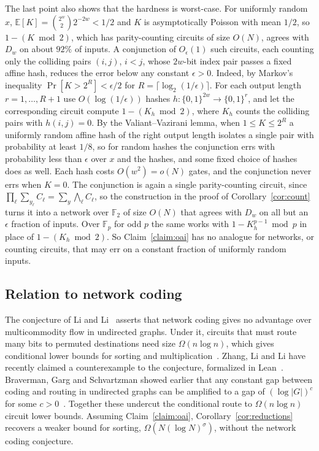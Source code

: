 \documentclass[11pt]{article}
\theoremstyle{definition}
\newcommand{\Dw}{D_w}
\begin{document}
The last point also shows that the hardness is worst-case. For uniformly random $x$, $\mathbb E[K]=\binom{2^w}{2}2^{-2w}<1/2$ and $K$ is asymptotically Poisson with mean $1/2$, so $1-(K\bmod 2)$, which has parity-counting circuits of size $O(N)$, agrees with $\Dw$ on about $92\%$ of inputs. A conjunction of $O_\epsilon(1)$ such circuits, each counting only the colliding pairs $(i,j)$, $i<j$, whose $2w$-bit index pair passes a fixed affine hash, reduces the error below any constant $\epsilon>0$. Indeed, by Markov's inequality $\Pr[K>2^R]<\epsilon/2$ for $R=\lceil\log_2(1/\epsilon)\rceil$. For each output length $r=1,\dots,R+1$ use $O(\log(1/\epsilon))$ hashes $h:\{0,1\}^{2w}\to\{0,1\}^r$, and let the corresponding circuit compute $1-(K_h\bmod 2)$, where $K_h$ counts the colliding pairs with $h(i,j)=0$. By the Valiant--Vazirani lemma, when $1\le K\le 2^R$ a uniformly random affine hash of the right output length isolates a single pair with probability at least $1/8$, so for random hashes the conjunction errs with probability less than $\epsilon$ over $x$ and the hashes, and some fixed choice of hashes does as well. Each hash costs $O(w^2)=o(N)$ gates, and the conjunction never errs when $K=0$. The conjunction is again a single parity-counting circuit, since $\prod_\ell\sum_{y_\ell}C_\ell=\sum_{y}\bigwedge_\ell C_\ell$, so the construction in the proof of Corollary~\ref{cor:count} turns it into a network over $\mathbb F_2$ of size $O(N)$ that agrees with $\Dw$ on all but an $\epsilon$ fraction of inputs. Over $\mathbb F_p$ for odd $p$ the same works with $1-K_h^{p-1}\bmod p$ in place of $1-(K_h\bmod 2)$. So Claim~\ref{claim:oai} has no analogue for networks, or counting circuits, that may err on a constant fraction of uniformly random inputs.

\subsection{Relation to network coding}\label{sec:coding}

The conjecture of Li and Li~\cite{LL04} asserts that network coding gives no advantage over multicommodity flow in undirected graphs. Under it, circuits that must route many bits to permuted destinations need size $\Omega(n\log n)$, which gives conditional lower bounds for sorting and multiplication~\cite{FHLS19,AFKL19,ALS21}. Zhang, Li and Li have recently claimed a counterexample to the conjecture, formalized in Lean~\cite{ZLL26}. Braverman, Garg and Schvartzman showed earlier that any constant gap between coding and routing in undirected graphs can be amplified to a gap of $(\log|G|)^{c}$ for some $c>0$~\cite{BGS17}. Together these undercut the conditional route to $\Omega(n\log n)$ circuit lower bounds. Assuming Claim~\ref{claim:oai}, Corollary~\ref{cor:reductions} recovers a weaker bound for sorting, $\Omega(N(\log N)^{\sigma})$, without the network coding conjecture.
\end{document}
